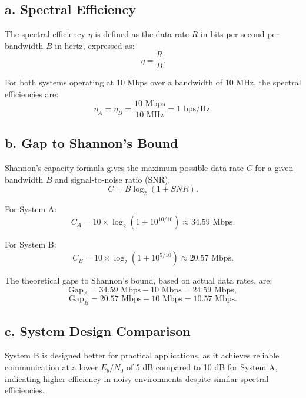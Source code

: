 \documentclass[12pt]{article}
\begin{document}
\subsection*{a. Spectral Efficiency}

The spectral efficiency $\eta$ is defined as the data rate $R$ in bits per second per bandwidth $B$ in hertz, expressed as:
\[
\eta = \frac{R}{B}.
\]

For both systems operating at 10 Mbps over a bandwidth of 10 MHz, the spectral efficiencies are:
\[
\eta_A = \eta_B = \frac{10 \text{ Mbps}}{10 \text{ MHz}} = 1 \text{ bps/Hz}.
\]

\subsection*{b. Gap to Shannon's Bound}

Shannon's capacity formula gives the maximum possible data rate $C$ for a given bandwidth $B$ and signal-to-noise ratio (SNR):
\[
C = B \log_2(1 + SNR).
\]

For System A:
\[
C_A = 10 \times \log_2(1 + 10^{10/10}) \approx 34.59 \text{ Mbps}.
\]

For System B:
\[
C_B = 10 \times \log_2(1 + 10^{5/10}) \approx 20.57 \text{ Mbps}.
\]

The theoretical gaps to Shannon’s bound, based on actual data rates, are:
\[
\text{Gap}_A = 34.59 \text{ Mbps} - 10 \text{ Mbps} = 24.59 \text{ Mbps},
\]
\[
\text{Gap}_B = 20.57 \text{ Mbps} - 10 \text{ Mbps} = 10.57 \text{ Mbps}.
\]

\subsection*{c. System Design Comparison}

System B is designed better for practical applications, as it achieves reliable communication at a lower $E_b/N_0$ of 5 dB compared to 10 dB for System A, indicating higher efficiency in noisy environments despite similar spectral efficiencies.
\end{document}
